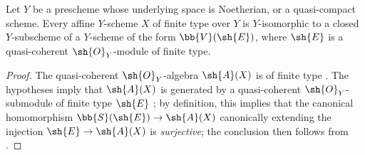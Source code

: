 \begin{proposition}[1.7.15]
\label{II.1.7.15}
Let $Y$ be a prescheme whose underlying space is Noetherian, or a quasi-compact scheme.
Every affine $Y$-scheme $X$ of finite type over $Y$ is $Y$-isomorphic to a closed $Y$-subscheme of a $Y$-scheme of the form $\bb{V}(\sh{E})$, where $\sh{E}$ is a quasi-coherent $\sh{O}_Y$-module of finite type.
\end{proposition}

\begin{proof}
The quasi-coherent $\sh{O}_Y$-algebra $\sh{A}(X)$ is of finite type .
The hypotheses imply that $\sh{A}(X)$ is generated by a quasi-coherent $\sh{O}_Y$-submodule of finite type $\sh{E}$ ; by definition, this implies that the canonical homomorphism $\bb{S}(\sh{E})\to\sh{A}(X)$ canonically extending the injection $\sh{E}\to\sh{A}(X)$ is \emph{surjective}; the conclusion then follows from .
\end{proof}
